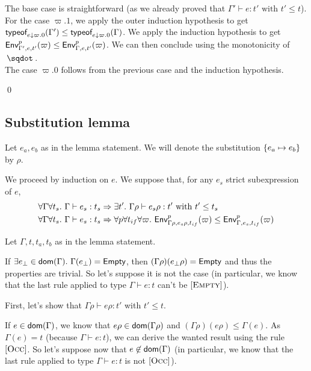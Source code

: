 \documentclass[a4paper]{article}
\theoremstyle{definition}
\begin{document}
        The base case is straightforward (as we already proved that $\Gamma' \vdash e:t' \text{ with } t' \leq t$).\\
        For the case $\varpi.1$, we apply the outer induction hypothesis to get $\tyof {\Gamma'} {\occ e {\varpi.0}} \leq \tyof {\Gamma} {\occ e {\varpi.0}}$.
        We apply the induction hypothesis to get $\Gp p {\Gamma',e,t'} (\varpi) \leq \Gp p {\Gamma,e,t'} (\varpi)$. We can then conclude using the monotonicity of $\worra {} {}$.\\
        The case $\varpi.0$ follows from the previous case and the induction hypothesis.
    
        \qed
    
        \subsection{Substitution lemma}
    
        Let $e_a,e_b$ as in the lemma statement. We will denote the substitution $\subst {e_a} {e_b}$ by $\rho$.
    
        We proceed by induction on $e$. We suppose that, for any $e_s$ strict subexpression of $e$,
        \begin{align*}
          \forall \Gamma \forall t_s.\ &\Gamma \vdash e_s:t_s \Rightarrow \exists t'.\ \Gamma \rho \vdash e_s \rho:t' \text{ with } t'\leq t_s\\
          \forall \Gamma \forall t_s.\ &\Gamma \vdash e_s:t_s \Rightarrow \forall p \forall t_{if} \forall \varpi.\ \Gp p {\Gamma\rho,e_s\rho,t_{if}} (\varpi) \leq \Gp p {\Gamma,e_s,t_{if}} (\varpi)
        \end{align*}
    
        Let $\Gamma,t,t_a,t_b$ as in the lemma statement.
    
        If $\exists e_\bot \in \dom {\Gamma}.\ \Gamma(e_\bot) = \Empty$, then $(\Gamma\rho)(e_\bot\rho) = \Empty$ and thus the properties are trivial.
        So let's suppose it is not the case (in particular, we know that the last rule applied to type $\Gamma \vdash e:t$ can't be $\Rule{Empty}$).
    
        First, let's show that $\Gamma \rho \vdash e \rho:t'$ with $t'\leq t$.
    
        If $e\in\dom\Gamma$, we know that $e\rho\in\dom{\Gamma\rho}$ and $(\Gamma\rho)(e\rho) \leq \Gamma(e)$.
        As $\Gamma(e) = t$ (because $\Gamma \vdash e:t$), we can derive the wanted result using the rule $\Rule {Occ}$.
        So let's suppose now that $e\not\in\dom\Gamma$ (in particular, we know that the last rule applied to type $\Gamma \vdash e:t$ is not $\Rule{Occ}$).
        
\end{document}
